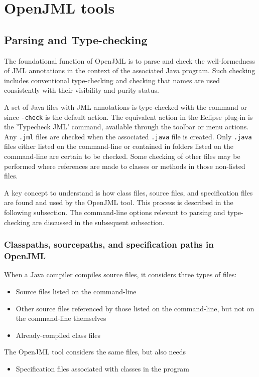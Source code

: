 
\chapter{OpenJML tools}

\section{Parsing and Type-checking}

The foundational function of OpenJML is to parse and check the well-formedness of JML annotations in the context of the associated Java program.
Such checking includes conventional type-checking and checking that names are used consistently with their visibility and purity status. 

A set of Java files with JML annotations is type-checked with the command
or
since \texttt{-check} is the default action.
The equivalent action in the Eclipse plug-in is the 'Typecheck JML' command, available through the toolbar or menu actions.
Any \texttt{.jml} files are checked when the associated \texttt{.java} file is created. Only \texttt{.java} files either listed on the command-line or contained in folders listed on the command-line are certain to be checked. Some checking of other files may be performed where references are made to classes or methods in those non-listed files.

A key concept to understand is how class files, source files, and specification files are found and used by the OpenJML tool. This
process is described in the following subsection. The command-line options relevant to parsing and type-checking are discussed in the subsequent subsection.

\subsection{Classpaths, sourcepaths, and specification paths in OpenJML}

When a Java compiler compiles source files, it considers three types of files:
\begin{itemize}[noitemsep,nolistsep]
\item Source files listed on the command-line
\item Other source files referenced by those listed on the command-line, but not on the command-line themselves
\item Already-compiled class files
\end{itemize}
The OpenJML tool considers the same files, but also needs
\begin{itemize}[noitemsep,nolistsep]
\item Specification files associated with classes in the program
\end{itemize}

